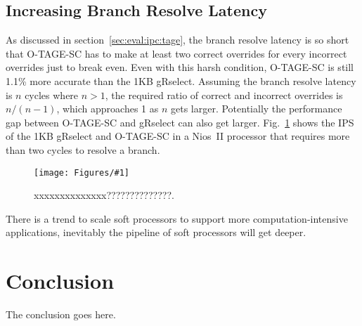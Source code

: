 \documentclass[conference]{IEEEtran}
\newcommand{\kfig}[4]{ %
        \begin{figure}[!t]
        \centering
        \texttt{[image: Figures/\#1]}
        \vspace{-1mm}
        \caption{#3}
        \label{#2}
        \end{figure}
}
\begin{document}

\subsection{Increasing Branch Resolve Latency}
\label{sec:eval:brresolvelatency}
As discussed in section~\ref{sec:eval:ipc:tage}, the branch resolve latency is so short that O-TAGE-SC has to make at least two correct overrides for every incorrect overrides just to break even. Even with this harsh condition, O-TAGE-SC is still 1.1\% more accurate than the 1KB gRselect. Assuming the branch resolve latency is $n$ cycles where $n > 1$, the required ratio of correct and incorrect overrides is $n/(n-1)$, which approaches 1 as $n$ gets larger. Potentially the performance gap between O-TAGE-SC and gRselect can also get larger. Fig.~\ref{fig:brresolve} shows the IPS of the 1KB gRselect and O-TAGE-SC in a Nios~II processor that requires more than two cycles to resolve a branch. 
\kfig{brresolve.pdf}{fig:brresolve}{xxxxxxxxxxxxxx??????????????.}{angle = 0, trim = 1in 1in 0.7in 1.5in, clip, width=0.4\textwidth}

There is a trend to scale soft processors to support more computation-intensive applications, inevitably the pipeline of soft processors will get deeper. 



\section{Conclusion}
The conclusion goes here.











\end{document}
